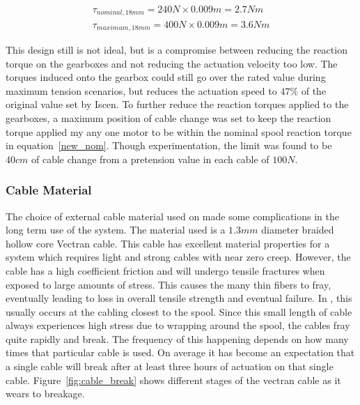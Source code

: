 \begin{align}
\tau_{nominal, 18mm} = 240N \times 0.009m = 2.7Nm \label{new_nom} \\
\tau_{maximum, 18mm} = 400N \times 0.009m = 3.6Nm \label{new_max}
\end{align}

This design still is not ideal, but is a compromise between reducing the reaction torque on the gearboxes and not reducing the actuation velocity too low.
The torques induced onto the gearbox could still go over the rated value during maximum tension scenarios, but reduces the actuation speed to \(47\%\) of the original value set by Iscen.
To further reduce the reaction torques applied to the gearboxes, a maximum position of cable change was set to keep the reaction torque applied my any one motor to be within the nominal spool reaction torque in equation~\ref{new_nom}.
Though experimentation, the limit was found to be \(40cm\) of cable change from a pretension value in each cable of \(100N\).

\subsubsection{Cable Material}
The choice of external cable material used on \SB{} made some complications in the long term use of the system.
The material used is a \(1.3mm\) diameter braided hollow core Vectran cable.
This cable has excellent material properties for a system which requires light and strong cables with near zero creep.
However, the cable has a high coefficient friction and will undergo tensile fractures when exposed to large amounts of stress.
This causes the many thin fibers to fray, eventually leading to loss in overall tensile strength and eventual failure. 
In \SB{}, this usually occurs at the cabling closest to the spool. 
Since this small length of cable always experiences high stress due to wrapping around the spool, the cables fray quite rapidly and break.
The frequency of this happening depends on how many times that particular cable is used.
On average it has become an expectation that a single cable will break after at least three hours of actuation on that single cable. 
Figure~\ref{fig:cable_break} shows different stages of the vectran cable as it wears to breakage.

